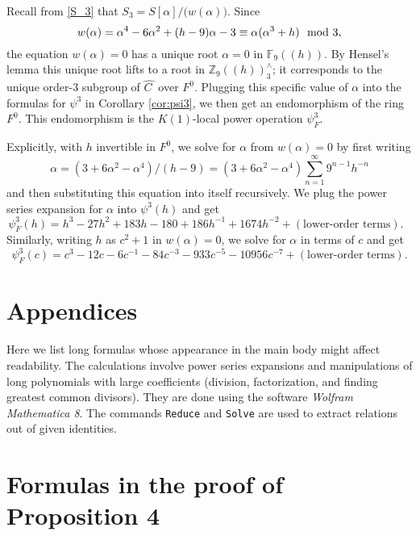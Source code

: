 \documentclass{gtpart}
\theoremstyle{definition}
\theoremstyle{remark}
\newcommand{\mb}[1]{\mathbb{#1}}
\newcommand{\BF}{{\mb F}}
\newcommand{\BZ}{{\mb Z}}
\newcommand{\HC}{\widehat{C~}\!}
\newcommand{\md}{~~{\rm mod}~}
\newcommand{\A}{\alpha}
\newcommand{\p}{\psi^3}
\begin{document}
Recall from \eqref{S_3} that $S_3 = S[\A] \big/ \big( w(\A) \big)$.  
Since 
\[
 w(\A) = \A^4 - 6 \A^2 + (h - 9) \A - 3 \equiv \A (\A^3 + h) \md 3, 
\]
the equation $w(\A) = 0$ has a unique root $\A = 0$ in $\BF_9 (\!(h)\!)$.  
By Hensel's lemma this unique root lifts to a root in 
$\BZ_9 (\!(h)\!)_3^\wedge$; it corresponds to the unique order-3 
subgroup of $\HC$ over $F^0$.  Plugging this specific value of $\A$ into 
the formulas for $\p$ in Corollary \ref{cor:psi3}, we then get an 
endomorphism of the ring $F^0$.  This endomorphism is the $K(1)$-local 
power operation $\psi_F^3$.  

Explicitly, with $h$ invertible in $F^0$, we solve for $\A$ from 
$w(\A) = 0$ by first writing 
\[
 \A = (3 + 6 \A^2 - \A^4) / (h - 9) = (3 + 6 \A^2 - \A^4) \sum_{n = 1}^\infty 9^{n-1} h^{-n} 
\]
and then substituting this equation into itself recursively.  We plug 
the power series expansion for $\A$ into $\p(h)$ and get 
\[
 \psi_F^3(h) = h^3 - 27 h^2 + 183 h - 180 + 186 h^{-1} + 1674 h^{-2} + (\text{lower-order terms}).  ~~~
\]
Similarly, writing $h$ as $c^2 + 1$ in $w(\A) = 0$, we solve for $\A$ in 
terms of $c$ and get 
\[
 \psi_F^3(c) = c^3 - 12 c - 6 c^{-1} - 84 c^{-3} - 933 c^{-5} - 10956 c^{-7} + (\text{lower-order terms}).  
\]


\appendix
\section*{Appendices}

Here we list long formulas whose appearance in the main body might 
affect readability.  The calculations involve power series expansions 
and manipulations of long polynomials with large coefficients (division, 
factorization, and finding greatest common divisors).  They are done 
using the software {\em Wolfram Mathematica 8}.  The commands 
\texttt{Reduce} and \texttt{Solve} are used to extract relations out of 
given identities.  


\section{Formulas in the proof of Proposition 4}
\label{apx:tors}
\end{document}
